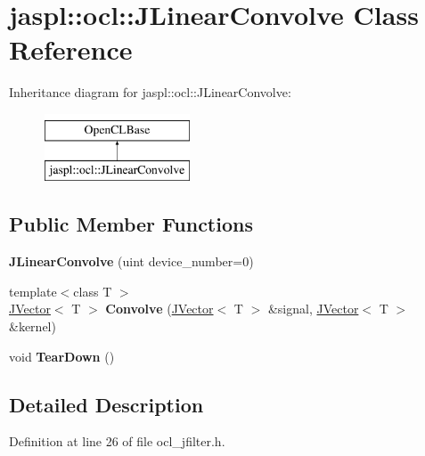 \hypertarget{classjaspl_1_1ocl_1_1_j_linear_convolve}{}\section{jaspl\+:\+:ocl\+:\+:J\+Linear\+Convolve Class Reference}
\label{classjaspl_1_1ocl_1_1_j_linear_convolve}
Inheritance diagram for jaspl\+:\+:ocl\+:\+:J\+Linear\+Convolve\+:\begin{figure}[H]
\begin{center}
\leavevmode
\includegraphics[height=2.000000cm]{classjaspl_1_1ocl_1_1_j_linear_convolve}
\end{center}
\end{figure}
\subsection*{Public Member Functions}
\begin{DoxyCompactItemize}
\item 
{\bfseries J\+Linear\+Convolve} (uint device\+\_\+number=0)\hypertarget{classjaspl_1_1ocl_1_1_j_linear_convolve_ac23d0dd668a469eb7ea80197c0074479}{}\label{classjaspl_1_1ocl_1_1_j_linear_convolve_ac23d0dd668a469eb7ea80197c0074479}

\item 
{\footnotesize template$<$class T $>$ }\\\hyperlink{classjaspl_1_1_j_vector}{J\+Vector}$<$ T $>$ {\bfseries Convolve} (\hyperlink{classjaspl_1_1_j_vector}{J\+Vector}$<$ T $>$ \&signal, \hyperlink{classjaspl_1_1_j_vector}{J\+Vector}$<$ T $>$ \&kernel)\hypertarget{classjaspl_1_1ocl_1_1_j_linear_convolve_a49242f52e8286cdb0844d15b5339fb6a}{}\label{classjaspl_1_1ocl_1_1_j_linear_convolve_a49242f52e8286cdb0844d15b5339fb6a}

\item 
void {\bfseries Tear\+Down} ()\hypertarget{classjaspl_1_1ocl_1_1_j_linear_convolve_a2f83a8cb691b32edfe86b1b97830b3b2}{}\label{classjaspl_1_1ocl_1_1_j_linear_convolve_a2f83a8cb691b32edfe86b1b97830b3b2}

\end{DoxyCompactItemize}


\subsection{Detailed Description}


Definition at line 26 of file ocl\+\_\+jfilter.\+h.

